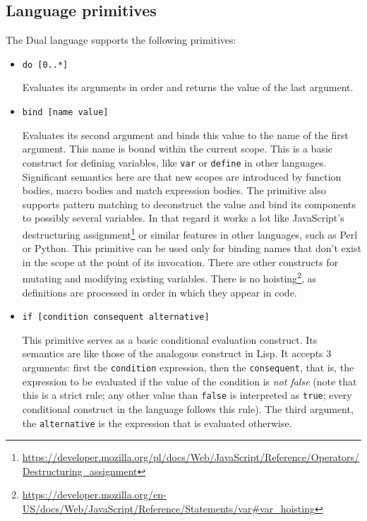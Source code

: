 \subsection{Language primitives}
  The Dual language supports the following
primitives:
\begin{itemize}
    \item \texttt{do [0..*]}
    
    Evaluates its arguments in order and returns the value of the last argument.
    
    \item \texttt{bind [name value]}
    
    Evaluates its second argument and binds this value to the name of the first
    argument. This name is bound within the current scope. This is a basic
    construct for defining variables, like \texttt{var} or \texttt{define} in
    other languages. Significant semantics here are that new scopes are
    introduced by function bodies, macro bodies and match expression bodies. The
    primitive also supports pattern matching to deconstruct the value and bind
    its components to possibly several variables. In that regard it works a lot
    like JavaScript's destructuring
    assignment\footnote{\url{https://developer.mozilla.org/pl/docs/Web/JavaScript/Reference/Operators/Destructuring_assignment}}
    or similar features in other languages, such as Perl or Python. This
    primitive can be used only for binding names that don't exist in the scope
    at the point of its invocation. There are other constructs for mutating and
    modifying existing variables. There is no
    hoisting\footnote{\url{https://developer.mozilla.org/en-US/docs/Web/JavaScript/Reference/Statements/var\#var_hoisting}},
    as definitions are processed in order in which they appear in code.
    
    \item \texttt{if [condition consequent alternative]}
    
    This primitive serves as a basic conditional evaluation construct. Its
    semantics are like those of the analogous construct in Lisp. It accepts 3
    arguments: first the \texttt{condition} expression, then the
    \texttt{consequent}, that is, the expression to be evaluated if the value of
    the condition is \textit{not false} (note that this is a strict rule; any
    other value than \texttt{false} is interpreted as \texttt{true}; every
    conditional construct in the language follows this rule). The third
    argument, the \texttt{alternative} is the expression that is evaluated
    otherwise.
    

\end{itemize}
